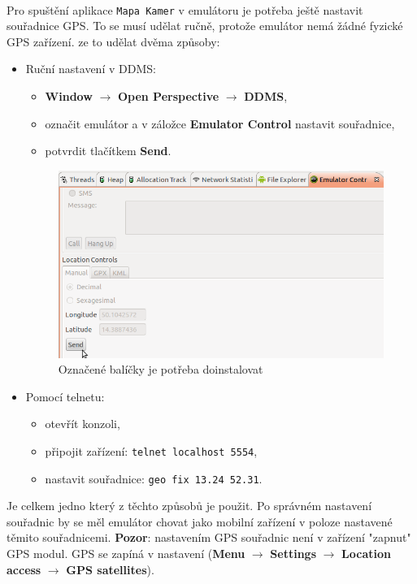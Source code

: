 \paragraph{}
Pro spuštění aplikace \texttt{Mapa Kamer} v emulátoru je potřeba ještě nastavit souřadnice GPS. To se musí udělat ručně, protože emulátor nemá žádné fyzické GPS zařízení. ze to udělat dvěma způsoby:
\begin{itemize}
\item Ruční nastavení v DDMS:
\begin{itemize}
\item \textbf{Window} $\rightarrow$ \textbf{Open Perspective} $\rightarrow$ \textbf{DDMS},
\item označit emulátor a v záložce \textbf{Emulator Control} nastavit souřadnice,
\item potvrdit tlačítkem \textbf{Send}.
\end{itemize}
\begin{figure}[hb]
\begin{center}
\includegraphics[scale=0.3]{pics/ddms.png}
\caption{Označené balíčky je potřeba doinstalovat}
\end{center}
\end{figure}
\item Pomocí telnetu:
\begin{itemize}
\item otevřít konzoli,
\item připojit zařízení: \texttt{telnet localhost 5554},
\item nastavit souřadnice: \texttt{geo fix 13.24 52.31}.
\end{itemize}
\end{itemize}
Je celkem jedno který z těchto způsobů je použit. Po správném nastavení souřadnic by se měl emulátor chovat jako mobilní zařízení v poloze nastavené těmito souřadnicemi. \textbf{Pozor}: nastavením GPS souřadnic není v zařízení "zapnut" GPS modul. GPS se zapíná v nastavení (\textbf{Menu} $\rightarrow$ \textbf{Settings} $\rightarrow$ \textbf{Location access} $\rightarrow$ \textbf{GPS satellites}). 

